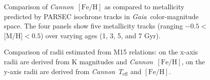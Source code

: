 \documentclass[modern]{aastex62}
\newcommand{\cannon}{\textsl{Cannon}}
\newcommand{\gaia}{\textsl{Gaia}}
\newcommand{\teff}{T_{\mathrm{eff}}}
\newcommand{\feh}{[{\mathrm{Fe}/\mathrm{H}}]}
\begin{document}
\begin{figure}[ht]
\caption{Comparison of \cannon\ $\feh$ as compared to metallicity predicted by PARSEC isochrone tracks \citealt{Bressan:2012} in \gaia\ color-magnitude space. The four panels show five metallicity tracks (ranging $-0.5<$[M/H]$<0.5$) over varying ages (1, 3, 5, and 7 Gyr). \label{fig:isochrone_cmd}}
\end{figure}

\begin{figure}[ht]
\caption{Comparison of radii estimated from M15 relations: on the x-axis radii are derived from  K magnitudes and \cannon\ $\feh$, on the y-axis radii are derived from \cannon\ $\teff$ and $\feh$. \label{fig:radii}}
\end{figure}


\end{document}
